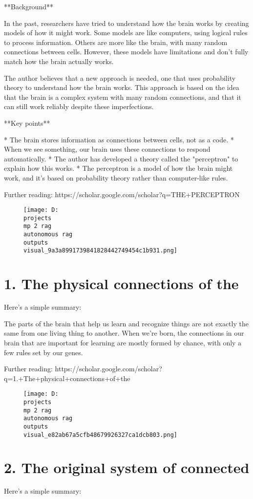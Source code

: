 \documentclass[12pt,a4paper]{article}
\begin{document}
**Background**

In the past, researchers have tried to understand how the brain works by creating models of how it might work. Some models are like computers, using logical rules to process information. Others are more like the brain, with many random connections between cells. However, these models have limitations and don't fully match how the brain actually works.

The author believes that a new approach is needed, one that uses probability theory to understand how the brain works. This approach is based on the idea that the brain is a complex system with many random connections, and that it can still work reliably despite these imperfections.

**Key points**

* The brain stores information as connections between cells, not as a code.
* When we see something, our brain uses these connections to respond automatically.
* The author has developed a theory called the "perceptron" to explain how this works.
* The perceptron is a model of how the brain might work, and it's based on probability theory rather than computer-like rules.

Further reading: https://scholar.google.com/scholar?q=THE+PERCEPTRON
\begin{figure}[h]
\centering
\texttt{[image: D:\\projects\\mp 2 rag\\autonomous rag\\outputs\\visual\_9a3a8991739841828442749454c1b931.png]}
\end{figure}
\section{1. The physical connections of the}
Here's a simple summary:

The parts of the brain that help us learn and recognize things are not exactly the same from one living thing to another. When we're born, the connections in our brain that are important for learning are mostly formed by chance, with only a few rules set by our genes.

Further reading: https://scholar.google.com/scholar?q=1.+The+physical+connections+of+the
\begin{figure}[h]
\centering
\texttt{[image: D:\\projects\\mp 2 rag\\autonomous rag\\outputs\\visual\_e82ab67a5cfb48679926327ca1dcb803.png]}
\end{figure}
\section{2. The original system of connected}
Here's a simple summary:
\end{document}
